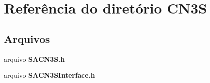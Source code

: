 \section{Referência do diretório C\+N3S}
\label{dir_fa3222bf7d0ad41fc343e9d536ceb8be}
\subsection*{Arquivos}
\begin{DoxyCompactItemize}
\item 
arquivo {\bf S\+A\+C\+N3\+S.\+h}
\item 
arquivo {\bf S\+A\+C\+N3\+S\+Interface.\+h}
\end{DoxyCompactItemize}
